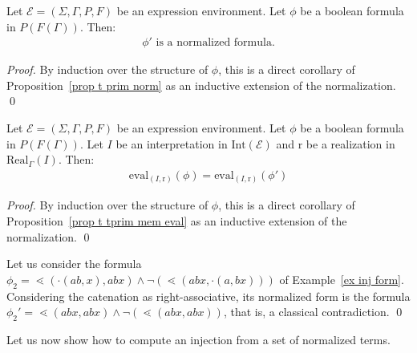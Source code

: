 \documentclass[a4paper]{llncs}
\begin{document}
  \begin{proposition}
    Let $\mathcal{E}=(\Sigma,\Gamma,P,F)$ be an expression environment. Let $\phi$ be a boolean formula in $P(F(\Gamma))$. Then:
        \begin{align*}
          \text{$\phi'$ is a normalized formula.}   
        \end{align*} 
  \end{proposition}
  \begin{proof}
    By induction over the structure of $\phi$, this is a direct corollary of Proposition~\ref{prop t prim norm} as an inductive extension of the normalization.
    \qed
  \end{proof}
  
  \begin{proposition}\label{prop normalization preserv eval}
    Let $\mathcal{E}=(\Sigma,\Gamma,P,F)$ be an expression environment. Let $\phi$ be a boolean formula in $P(F(\Gamma))$. Let $I$ be an interpretation in $\mathrm{Int}(\mathcal{E})$ and $\mathrm{r}$ be a realization in $\mathrm{Real}_\Gamma(I)$. Then:
        \begin{align*}
          \mathrm{eval}_{(I,\mathrm{r})}(\phi)=\mathrm{eval}_{(I,\mathrm{r})}(\phi')
        \end{align*}
  \end{proposition}
  \begin{proof}
    By induction over the structure of $\phi$, this is a direct corollary of Proposition~\ref{prop t tprim mem eval} as an inductive extension of the normalization.
    \qed
  \end{proof}
  
  \begin{example}
    Let us consider the formula $\phi_2=\lessdot(\cdot(ab,x),abx)\wedge \neg (\lessdot(abx,\cdot(a,bx)))$ of Example~\ref{ex inj form}. Considering the catenation as right-associative, its normalized form is the formula $\phi_2'=\lessdot(abx,abx)\wedge \neg (\lessdot(abx,abx))$, that is, a classical contradiction.
    \qed
  \end{example}
  
  Let us now show how to compute an injection from a set of normalized terms.
  
\end{document}
